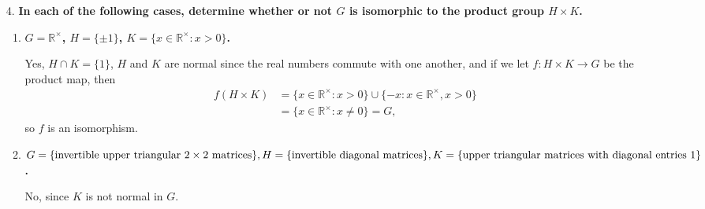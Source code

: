 \documentclass[a4paper,12pt]{article}
\begin{document}
\begin{enumerate}
    \item[4.]
        \boldmath
        \textbf{In each of the following cases, determine whether or not $G$ is isomorphic to the product group $H \times K$.} \par
        \begin{enumerate}
            \item
                \boldmath
                \textbf{$G = \mathbb{R}^\times$, $H = \{ \pm 1 \}$, $K = \{ x \in \mathbb{R}^\times : x > 0 \}$.} \par
                \unboldmath
                Yes, $H \cap K = \{ 1 \}$, $H$ and $K$ are normal since the real numbers commute with one another, and if we let $f : H \times K \to G$ be the product map, then
                \begin{align*}
                    f(H \times K) &= \{ x \in \mathbb{R}^\times : x > 0 \} \cup \{ -x : x \in \mathbb{R}^\times, x > 0 \} \\
                    &= \{ x \in \mathbb{R}^\times : x \neq 0 \} = G,
                \end{align*}
                so $f$ is an isomorphism.

            \item
                \boldmath
                \textbf{$G = \{ \text{invertible upper triangular } 2 \times 2 \text{ matrices} \}, \\
                H = \{ \text{invertible diagonal matrices} \}, \\
                K = \{ \text{upper triangular matrices with diagonal entries 1} \}$.} \par
                \unboldmath
                \iffalse
                Yes, if we let $f : H \times K \to G$ be the product map, then
                \begin{align*}
                    f(H \times K) &= \left\{
                        \left[ \begin{array}{cc}
                                a & 0 \\
                                0 & b
                        \end{array} \right]
                        \left[ \begin{array}{cc}
                                1 & c \\
                                0 & 1
                        \end{array} \right]
                        : a, b, c \in \mathbb{C}, a \neq 0, b \neq 0
                    \right\} \\
                    &= \left\{
                        \left[ \begin{array}{cc}
                                a & ac \\
                                0 & b
                        \end{array} \right]
                        : a, b, c \in \mathbb{C}, a \neq 0, b \neq 0
                    \right\} = G,
                \end{align*}
                so $f$ is an isomorphism.
                \fi
                No, since $K$ is not normal in $G$.


\end{enumerate}
\end{enumerate}
\end{document}
